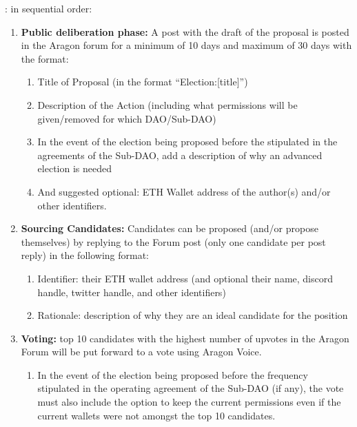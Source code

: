 \begin{enumerate}
\begin{enumerate}
		: in sequential order:
		\begin{enumerate}
			\item \textbf{Public deliberation phase:} A post with the draft of the proposal is posted
			in the Aragon forum for a minimum of 10 days and maximum of 30 days with the format:
			\begin{enumerate}
				\item Title of Proposal (in the format “Election:[title]”)
				\item Description of the Action (including what permissions will be
				given/removed for which \ac{DAO}/Sub-\ac{DAO})
				\item In the event of the election being proposed before the stipulated in
				the agreements of the Sub-\ac{DAO}, add a description of why an
				advanced election is needed
				\item And suggested optional: ETH Wallet address of the author(s)
				and/or other identifiers.
			\end{enumerate}

			\item \textbf{Sourcing Candidates:} Candidates can be proposed (and/or propose themselves) by replying to the Forum post (only one candidate per post reply) in the following format:
			\begin{enumerate}
				\item Identifier: their ETH wallet address (and optional their name, discord handle, twitter handle, and other identifiers)
				\item Rationale: description of why they are an ideal candidate for the position
			\end{enumerate}

			\item \textbf{Voting:} top 10 candidates with the highest number of upvotes in the Aragon Forum will be put forward to a vote using Aragon Voice.
			\begin{enumerate}
				\item In the event of the election being proposed before the frequency stipulated in the operating agreement of the Sub-\ac{DAO} (if any), the vote must also include the option to keep the current permissions even if the current wallets were not amongst the top 10 candidates.
			\end{enumerate}


\end{enumerate}
\end{enumerate}
\end{enumerate}
